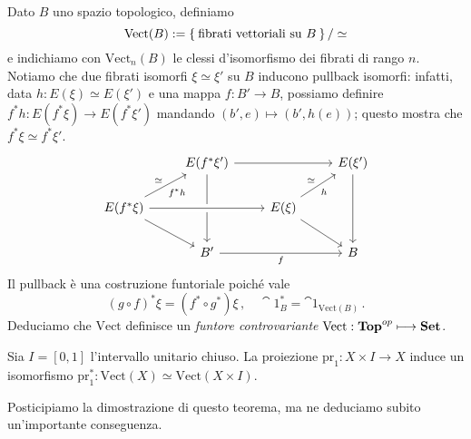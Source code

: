 Dato $B$ uno spazio topologico, definiamo
\begin{equation*}
	\mathrm{Vect}(B) := \Set{\text{fibrati vettoriali su } B}/\simeq
\end{equation*}
e indichiamo con $\mathrm{Vect}_{n}(B)$ le clessi d'isomorfismo
dei fibrati di rango $n$.
Notiamo che due fibrati isomorfi $\xi \simeq \xi'$ su $B$
inducono pullback isomorfi: infatti, data $h : E(\xi) \simeq E(\xi')$
e una mappa $f:B' \to B$, 
possiamo definire $f^{*}h : E(f^{*}\xi) \to E(f^{*}\xi')$ mandando $(b',e) \mapsto (b',h(e))$;
questo mostra che $f^{*}\xi \simeq f^{*}\xi'$.
\begin{equation*}
\begin{tikzcd}
                                                        & E(f^{*}\xi')  \arrow[dd] \ar[rr] &                                    & E(\xi') \arrow[dd] \\
E(f^{*}\xi) \arrow[rr] \arrow[rd] \arrow[ru, "f^{*}h"', "\simeq"] &                                    & E(\xi) \arrow[from=ll, crossing over] \arrow[rd] \arrow[ru, "h"', "\simeq"] &                    \\
                                                        & B' \arrow[rr, "f"']                &                                    & B                 
\end{tikzcd}
\end{equation*}
Il pullback è una costruzione funtoriale poiché vale
\begin{equation*}
	(g \circ f)^{*}\xi = (f^{*} \circ g^{*})\xi\,, \quad \cat{1}_{B}^{*} = \cat{1}_{\mathrm{Vect}(B)}\,.
\end{equation*}
Deduciamo che $\mathrm{Vect}$ definisce un \emph{funtore controvariante} 
	$\mathrm{Vect} : {\normalfont\textbf{Top}}^{op} \longmapsto {\normalfont\textbf{Set}}$.




\begin{thm}\label{vect-htp}
	Sia $I = [0,1]$ l'intervallo unitario chiuso.
	La proiezione $\mathrm{pr}_{1}:X \times I \to X$ induce un isomorfismo
	$\mathrm{pr}_{1}^{*} : \mathrm{Vect}(X) \simeq \mathrm{Vect}(X \times I)$.
\end{thm}

Posticipiamo la dimostrazione di questo teorema,
ma ne deduciamo subito un'importante conseguenza.

